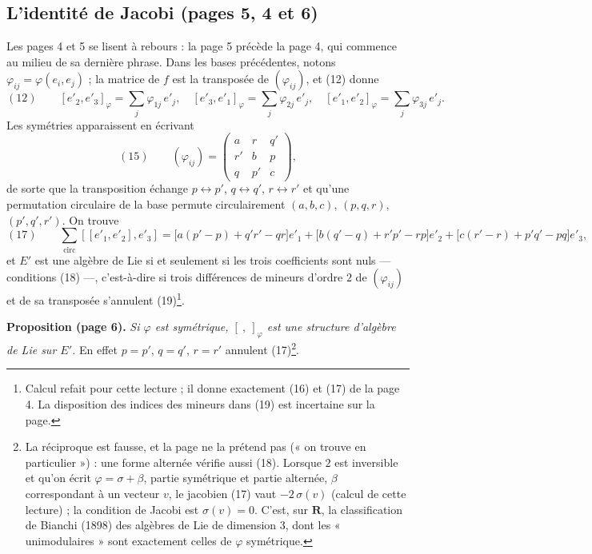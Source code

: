 \documentclass[11pt,a4paper]{article}
\begin{document}
\subsection*{L'identité de Jacobi (pages 5, 4 et 6)}

Les pages 4 et 5 se lisent à rebours : la page 5 précède la page 4, qui commence
au milieu de sa dernière phrase. Dans les bases précédentes, notons
$\varphi_{ij} = \varphi(e_i, e_j)$ ; la matrice de $f$ est la transposée de
$(\varphi_{ij})$, et (12) donne
\[
  (12) \qquad [e'_2, e'_3]_{\varphi} = \sum_j \varphi_{1j}\, e'_j , \quad
  [e'_3, e'_1]_{\varphi} = \sum_j \varphi_{2j}\, e'_j , \quad
  [e'_1, e'_2]_{\varphi} = \sum_j \varphi_{3j}\, e'_j .
\]
Les symétries apparaissent en écrivant
\[
  (15) \qquad (\varphi_{ij}) = \begin{pmatrix} a & r & q' \\ r' & b & p \\ q & p' & c \end{pmatrix},
\]
de sorte que la transposition échange $p \leftrightarrow p'$, $q \leftrightarrow q'$,
$r \leftrightarrow r'$ et qu'une permutation circulaire de la base permute
circulairement $(a, b, c)$, $(p, q, r)$, $(p', q', r')$. On trouve
\[
  (17) \qquad
  \sum_{\text{circ}} [[e'_1, e'_2], e'_3]
  = \bigl[a(p' - p) + q'r' - qr\bigr] e'_1
  + \bigl[b(q' - q) + r'p' - rp\bigr] e'_2
  + \bigl[c(r' - r) + p'q' - pq\bigr] e'_3 ,
\]
et $E'$ est une algèbre de Lie si et seulement si les trois coefficients sont
nuls — conditions (18) —, c'est-à-dire si trois différences de mineurs d'ordre
$2$ de $(\varphi_{ij})$ et de sa transposée s'annulent (19)\footnote{Calcul refait
pour cette lecture ; il donne exactement (16) et (17) de la page 4. La
disposition des indices des mineurs dans (19) est incertaine sur la page.}.

\textbf{Proposition (page 6).} \emph{Si $\varphi$ est symétrique, $[\ ,\ ]_{\varphi}$
est une structure d'algèbre de Lie sur $E'$.} En effet $p = p'$, $q = q'$,
$r = r'$ annulent (17)\footnote{La réciproque est fausse, et la page ne la
prétend pas (« on trouve en particulier ») : une forme alternée vérifie aussi
(18). Lorsque $2$ est inversible et qu'on écrit $\varphi = \sigma + \beta$, partie
symétrique et partie alternée, $\beta$ correspondant à un vecteur $v$, le
jacobien (17) vaut $-2\,\sigma(v)$ (calcul de cette lecture) ; la condition de
Jacobi est $\sigma(v) = 0$. C'est, sur $\mathbf{R}$, la classification de Bianchi
(1898) des algèbres de Lie de dimension $3$, dont les « unimodulaires » sont
exactement celles de $\varphi$ symétrique.}.
\end{document}
